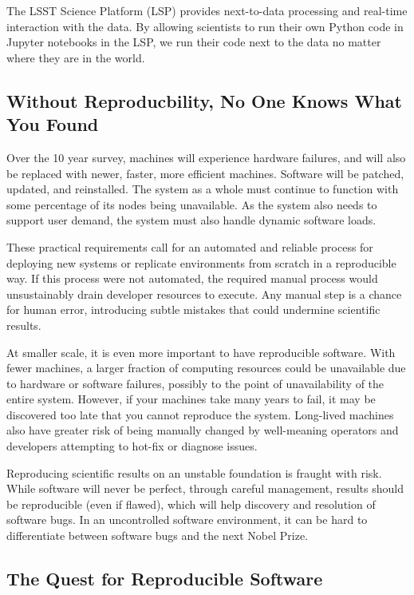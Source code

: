 \documentclass[11pt,twoside]{article}
\begin{document}
The LSST Science Platform (LSP) provides next-to-data processing and 
real-time interaction with the data.  By allowing scientists to run their own
Python code in Jupyter notebooks in the LSP, we run their code next to
the data no matter where they are in the world.

\subsection{Without Reproducbility, No One Knows What You Found}

Over the 10 year survey, machines will experience hardware failures, and
will also be replaced with newer, faster, more efficient machines.
Software will be patched, updated, and reinstalled.  The system as a whole
must continue to function with some percentage of its nodes being unavailable.
As the system also needs to support user demand, the system
must also handle dynamic software loads.

These practical requirements call for an automated and reliable process for
deploying new systems or replicate environments from scratch in a reproducible
way.  If this process were not automated, the required manual process would unsustainably
drain developer resources to execute.  Any manual step is a chance for human error,
introducing subtle mistakes that could undermine scientific results.

At smaller scale, it is even more important to have reproducible software.  With
fewer machines, a larger fraction of computing resources could be unavailable due to
hardware or software failures, possibly to the point of unavailability of the entire
system.  However, if your machines take many years to fail, it may be discovered too
late that you cannot reproduce the system. 
Long-lived machines also have greater risk of being manually changed by
well-meaning operators and developers attempting to hot-fix or diagnose issues.

Reproducing scientific results on an unstable foundation is fraught with risk.
While software will never be perfect, through careful management, results should
be reproducible (even if flawed), which will help discovery and resolution of
software bugs.  In an uncontrolled software environment, it can be hard to
differentiate between software bugs and the next Nobel Prize.

\subsection{The Quest for Reproducible Software}
\end{document}

